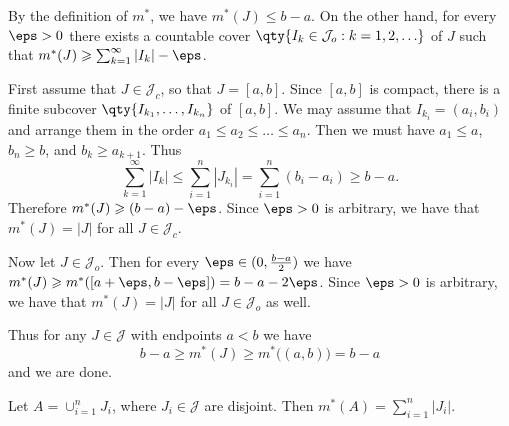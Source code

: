 \documentclass{maths}
\newcommand{\intvl}{\mathcal{J}}
\begin{document}
\begin{prf}
    By the definition of $m^*$, we have $m^*(J)\leqslant b-a$.
    On the other hand, for every $\eps>0$ there exists a countable cover $\qty{I_k\in\intvl_o : k = 1,2,\ldots}$ of $J$ such that $m^*(J)\geqslant\sum_{k=1}^{\infty} |I_k| - \eps$.

    First assume that $J\in\intvl_c$, so that $J=[a,b]$.
    Since $[a,b]$ is compact, there is a finite subcover $\qty{I_{k_1},\ldots,I_{k_n}}$ of $[a,b]$.
    We may assume that $I_{k_i} = (a_i, b_i)$ and arrange them in the order $a_1\leqslant a_2\leqslant\ldots\leqslant a_n$.
    Then we must have $a_1\leqslant a$, $b_n\geqslant b$, and $b_k\geqslant a_{k+1}$.
    Thus
    \[
        \sum_{k=1}^{\infty} |I_k| \leqslant
        \sum_{i=1}^n |J_{k_i}| =
        \sum_{i=1}^n (b_i - a_i) \geqslant
        b - a.
    \]
    Therefore $m^*(J)\geqslant (b - a) - \eps$.
    Since $\eps>0$ is arbitrary, we have that $m^*(J) = |J|$ for all $J\in\intvl_c$.

    Now let $J\in\intvl_o$.
    Then for every $\eps\in(0, \frac{b-a}{2})$ we have $m^*(J)\geqslant m^*([a + \eps, b - \eps]) = b - a - 2\eps$.
    Since $\eps>0$ is arbitrary, we have that $m^*(J) = |J|$ for all $J\in\intvl_o$ as well.

    Thus for any $J\in\intvl$ with endpoints $a < b$ we have
    \[
        b - a \geqslant
        m^*(J) \geqslant
        m^*\big((a,b)\big) =
        b - a
    \]
    and we are done.
\end{prf}

\begin{lem}
    Let $A=\cup_{i=1}^n J_i$, where $J_i\in\intvl$ are disjoint.
    Then $m^*(A) = \sum_{i=1}^n |J_i|$.
\end{lem}
\end{document}
